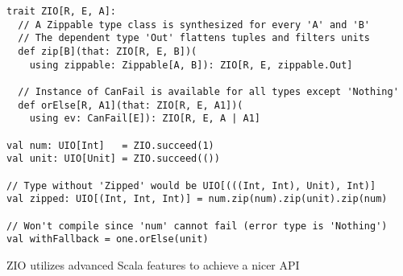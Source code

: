 \begin{algorithm}

\begin{verbatim}
trait ZIO[R, E, A]:
  // A Zippable type class is synthesized for every 'A' and 'B'
  // The dependent type 'Out' flattens tuples and filters units
  def zip[B](that: ZIO[R, E, B])(
    using zippable: Zippable[A, B]): ZIO[R, E, zippable.Out]
  
  // Instance of CanFail is available for all types except 'Nothing'
  def orElse[R, A1](that: ZIO[R, E, A1])(
    using ev: CanFail[E]): ZIO[R, E, A | A1]

val num: UIO[Int]   = ZIO.succeed(1)
val unit: UIO[Unit] = ZIO.succeed(())

// Type without 'Zipped' would be UIO[(((Int, Int), Unit), Int)]
val zipped: UIO[(Int, Int, Int)] = num.zip(num).zip(unit).zip(num)

// Won't compile since 'num' cannot fail (error type is 'Nothing')
val withFallback = one.orElse(unit)
\end{verbatim}

\caption{ZIO utilizes advanced Scala features to achieve a nicer API \label{zio:nice-api}}
\end{algorithm}